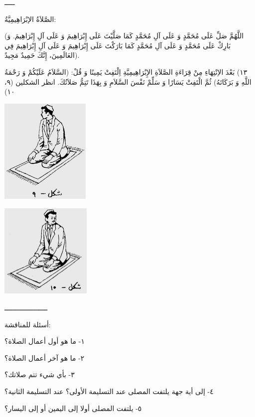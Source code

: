 \documentclass[a5paper]{article}
\begin{document}
ـــــ

الصَّلاَةُ الإبْرَاهِيمِيَّةُ:

(اللَّهُمَّ صَلِّ عَلَى مُحَمَّدٍ وَ عَلَى آلِ مُحَمَّدٍ كَمَا صَلَّيْتَ عَلَى إِبْرَاهِيمَ وَ عَلَى آلِ إِبْرَاهِيمَ. وَ بَارِكْ عَلَى مُحَمَّدٍ وَ عَلَى آلِ مُحَمَّدٍ كَمَا بَارَكْتَ عَلَى إِبْرَاهِيمَ وَ عَلَى آلِ إِبْرَاهِيمَ فِي العَالَمِينَ، إِنَّكَ حَمِيدٌ مَجِيدٌ).

١٣) بَعْدَ الاِنْتِهَاءِ مِنْ قِرَاءَةِ الصَّلاَةِ الإِبْرَاهِيمِيَّةِ اِلْتَفِتْ يَمِينًا وَ قُلْ: (السَّلاَمُ عَلَيْكُمْ وَ رَحْمَةُ اللَّهِ وَ بَرَكَاتَهُ) ثُمَّ الْتَفِتْ يَسَارًا وَ سَلِّمْ نَفْسَ السَّلاَمِ وَ بِهَذَا تَتِمُّ صَلاَتُكَ. انظر الشكلين (٩، ١٠)

\begin{center}
\includegraphics[width=1.698in,height=1.9902in]{images/MuhammadBagauddinprettified-img351.png}
\end{center}
\begin{center}
\includegraphics[width=1.7165in,height=1.7925in]{images/MuhammadBagauddinprettified-img352.png}
\end{center}
ـــــــــــــــــــــ 

أسئلة للمناقشة:

١- ما هو أول أعمال الصلاة؟

٢- ما هو آخر أعمال الصلاة؟

٣- بأي شيء تتم صلاتك؟

٤- إلى أية جهة يلتفت المصلى عند التسليمة الأولى؟ عند التسليمة الثانية؟

٥- يلتفت المصلى أولا إلى اليمين أو إلى اليسار؟
\end{document}
